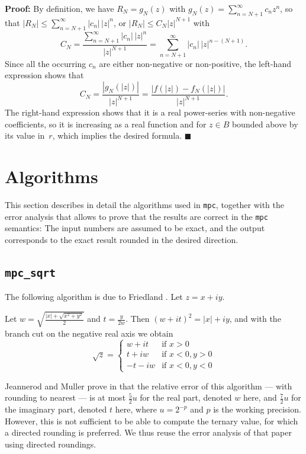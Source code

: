\documentclass [11pt]{article}
\newcommand {\mpc}{{\tt mpc}}
\renewcommand {\leq}{\leqslant}
\newenvironment{proof}{\noindent \textbf {Proof:}}{{\hspace* {\fill}$\blacksquare$}}
\begin{document}
\begin {proof}
By definition, we have $R_N = g_N (z)$ with
$g_N (z) = \sum_{n = N+1}^\infty c_n z^n$, so that
$|R_N| \leq \sum_{n=N+1}^\infty |c_n| \, |z|^n$,
or
$|R_N| \leq C_N |z|^{N+1}$
with
\[
C_N = \frac {\sum_{n=N+1}^\infty |c_n| \, |z|^n}{|z|^{N+1}}
    = \sum_{n=N+1}^\infty |c_n| \, |z|^{n - (N+1)}.
\]
Since all the occurring $c_n$ are either non-negative or non-positive,
the left-hand expression shows that
\[
C_N = \frac {|g_N (|z|)|}{|z|^{N+1}}
    = \frac {|f (|z|) - f_N (|z|)|}{|z|^{N+1}}.
\]
The right-hand expression shows that it is a real power-series with
non-negative coefficients, so it is increasing as a real function and
for $z \in B$ bounded above by its value in~$r$, which implies the
desired formula.
\end {proof}

\section {Algorithms}
\label {sec:algorithms}

This section describes in detail the algorithms used in \mpc, together with
the error analysis that allows to prove that the results are correct in the
{\mpc} semantics: The input numbers are assumed to be exact, and the output
corresponds to the exact result rounded in the desired direction.


\subsection {\texttt {mpc\_sqrt}}

The following algorithm is due to Friedland \cite{Friedland67,Smith98}.
Let $z = x + i y$.

Let $w = \sqrt { \frac {|x| + \sqrt {x^2 + y^2}}{2}}$ and
$t = \frac {y}{2w}$. Then $(w + it)^2 = |x| + iy$, and with the branch cut on the negative real axis we obtain
\[
\sqrt z = \left\{
\begin {array}{cl}
w + i t & \text {if } x > 0 \\
t + i w & \text {if } x < 0, y > 0 \\
-t - i w & \text {if } x < 0, y < 0
\end {array}
\right.
\]

Jeannerod and Muller prove in \cite{jeannerod:ensl-01780265} that the relative
error of this algorithm --- with rounding to nearest ---
is at most $\frac{5}{2} u$ for the real part, denoted
$w$ here, and
$\frac{7}{2} u$ for the imaginary part, denoted $t$ here,
where $u = 2^{-p}$ and $p$ is the
working precision.
However, this is not sufficient to be able to compute the ternary value,
for which a directed rounding is preferred.
We thus reuse the error analysis of that paper using directed roundings.
\end{document}
